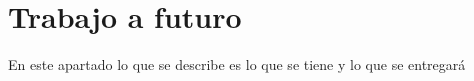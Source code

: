 \chapter{Trabajo a futuro}
	En este apartado lo que se describe es lo que se tiene y lo que se entregará